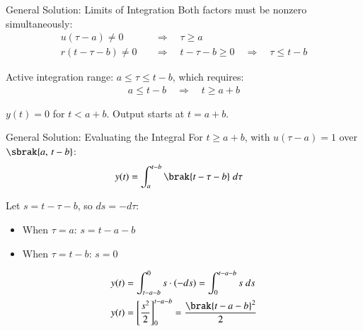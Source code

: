 \documentclass{beamer}
\begin{document}
\begin{frame}{General Solution: Limits of Integration}
Both factors must be nonzero simultaneously:
\begin{align}
    u(\tau - a) \neq 0 \quad &\Rightarrow \quad \tau \geq a \label{eq:g1}\\
    r(t-\tau-b) \neq 0 \quad &\Rightarrow \quad t-\tau-b \geq 0 \quad \Rightarrow \quad \tau \leq t-b \label{eq:g2}
\end{align}

Active integration range: $a \leq \tau \leq t-b$, which requires:
\begin{align}
    a \leq t - b \quad \Rightarrow \quad t \geq a + b
\end{align}

\begin{block}{}
    $y(t) = 0$ for $t < a+b$. \quad Output starts at $t = a+b$.
\end{block}
\end{frame}

\begin{frame}{General Solution: Evaluating the Integral}
For $t \geq a+b$, with $u(\tau-a)=1$ over $\sbrak{a,\,t-b}$:
\begin{align}
    y(t) &= \int_{a}^{t-b} \brak{t - \tau - b}\;d\tau
\end{align}

Let $s = t - \tau - b$, so $ds = -d\tau$:
\begin{itemize}
    \item When $\tau = a$: \quad $s = t - a - b$
    \item When $\tau = t-b$: \; $s = 0$
\end{itemize}
\begin{align}
    y(t) &= \int_{t-a-b}^{0} s\cdot(-ds) = \int_{0}^{t-a-b} s\;ds \\
    y(t) &= \left[\frac{s^2}{2}\right]_0^{t-a-b} = \frac{\brak{t-a-b}^2}{2}
\end{align}
\end{frame}
\end{document}
